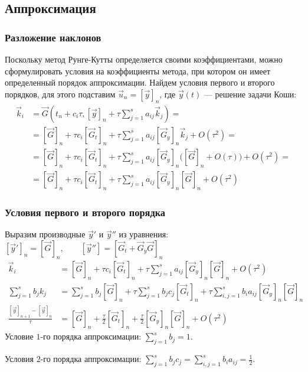\documentclass[professionalfonts,compress,unicode,aspectratio=169]{beamer}
\begin{document}
\subsection{Аппроксимация}
\begin{frame}\frametitle{Разложение наклонов}
	Поскольку метод Рунге-Кутты определяется своими коэффициентами, можно сформулировать условия на коэффициенты метода, при котором
	он имеет определенный порядок аппроксимации. Найдем условия первого и
второго порядков, для этого подставим $\vec u_n = [\vec y]_n$, где $\vec y(t)$ ---
	решение задачи Коши:
	\begin{align*}
	\vec k_i &= \vec G(t_n + c_i \tau, [\vec y]_n + \tau \sum\nolimits_{j=1}^s a_{ij}
\vec k_j) =\\
			&= [\vec G]_n + \tau c_i [\vec G_t]_n + \tau \sum\nolimits_{j=1}^s
a_{ij} [\vec G_y]_n \vec k_j + O(\tau^2) = \\
			&= [\vec G]_n + \tau c_i [\vec G_t]_n + \tau \sum\nolimits_{j=1}^s
a_{ij} [\vec G_y]_n \Big([\vec G]_n + O(\tau)\Big) + O(\tau^2) = \\
			&= [\vec G]_n + \tau c_i [\vec G_t]_n + \tau \sum\nolimits_{j=1}^s
a_{ij} [\vec G_y]_n [\vec G]_n + O(\tau^2)
	\end{align*}
\end{frame}

\begin{frame}\frametitle{Условия первого и второго порядка}
	Выразим производные $\vec y'$ и $\vec y''$ из уравнения:
	$
		[\vec y']_n = [\vec G]_n, \qquad [\vec y''] = [\vec G_t + \vec G_y \vec G]_n
	$
	\begin{align*}
	\vec k_i &= [\vec G]_n + \tau c_i [\vec G_t]_n + \tau \sum_{j=1}^s a_{ij}
[\vec G_y]_n [\vec G]_n + O(\tau^2)\\
	\sum_{j=1}^s b_j k_j &=
	\sum_{j=1}^s b_j [\vec G]_n + \tau \sum_{j=1}^s b_j c_j [\vec G_t]_n + \tau
\sum_{i,j=1}^s b_i a_{ij} [\vec G_y]_n[\vec G]_n \\
	\frac{[\vec y]_{n+1}-[\vec y]_n}{\tau} &= [\vec G]_n + \frac{\tau}{2}[\vec
G_t]_n + \frac{\tau}{2}[\vec G_y]_n [\vec G]_n + O(\tau^2)
	\end{align*}
	\pause
	Условие $1$-го порядка аппроксимации: $\displaystyle \sum_{j=1}^s b_j = 1$.

	Условия $2$-го порядка аппроксимации: $\displaystyle \sum_{j=1}^s b_j c_j = \sum_{i,j=1}^s b_i a_{ij} = \frac{1}{2}$.
\end{frame}
\end{document}
